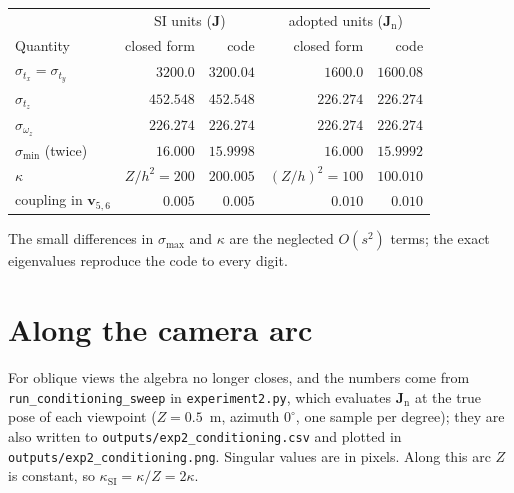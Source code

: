 \documentclass[11pt,a4paper]{article}
\theoremstyle{remark}
\newcommand{\Jmat}{\mathbf{J}}
\newcommand{\vvec}{\mathbf{v}}
\begin{document}
\begin{center}
\begin{tabular}{@{}lrrrr@{}}
\toprule
 & \multicolumn{2}{c}{SI units ($\Jmat$)}
 & \multicolumn{2}{c}{adopted units ($\Jmat_{\mathrm{n}}$)} \\
Quantity & closed form & code & closed form & code \\
\midrule
$\sigma_{t_x} = \sigma_{t_y}$ & $3200.0$ & $3200.04$ & $1600.0$ & $1600.08$ \\
$\sigma_{t_z}$ & $452.548$ & $452.548$ & $226.274$ & $226.274$ \\
$\sigma_{\omega_z}$ & $226.274$ & $226.274$ & $226.274$ & $226.274$ \\
$\sigma_{\min}$ (twice) & $16.000$ & $15.9998$ & $16.000$ & $15.9992$ \\
$\kappa$ & $Z/h^2 = 200$ & $200.005$ & $(Z/h)^2 = 100$ & $100.010$ \\
coupling in $\vvec_{5,6}$ & $0.005$ & $0.005$ & $0.010$ & $0.010$ \\
\bottomrule
\end{tabular}
\end{center}

\noindent
The small differences in $\sigma_{\max}$ and $\kappa$ are the neglected
$O(s^2)$ terms; the exact eigenvalues reproduce the code to every digit.

\section{Along the camera arc}
\label{sec:sweep}

For oblique views the algebra no longer closes, and the numbers come from
\texttt{run\_conditioning\_sweep} in \texttt{experiment2.py}, which evaluates
$\Jmat_{\mathrm{n}}$ at the true pose of each viewpoint ($Z = 0.5$~m, azimuth
$0^{\circ}$, one sample per degree); they are also written to
\texttt{outputs/exp2\_conditioning.csv} and plotted in
\texttt{outputs/exp2\_conditioning.png}. Singular values are in pixels. Along
this arc $Z$ is constant, so $\kappa_{\mathrm{SI}} = \kappa/Z = 2\kappa$.
\end{document}
